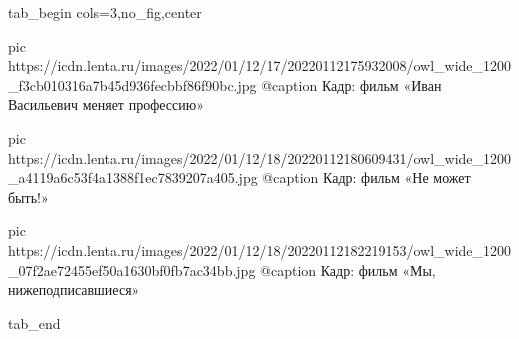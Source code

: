 
 
 
 
 


\ifcmt
  tab_begin cols=3,no_fig,center

     pic https://icdn.lenta.ru/images/2022/01/12/17/20220112175932008/owl_wide_1200_f3cb010316a7b45d936fecbbf86f90bc.jpg
		 @caption Кадр: фильм «Иван Васильевич меняет профессию»

		 pic https://icdn.lenta.ru/images/2022/01/12/18/20220112180609431/owl_wide_1200_a4119a6c53f4a1388f1ec7839207a405.jpg
		 @caption Кадр: фильм «Не может быть!»

		 pic https://icdn.lenta.ru/images/2022/01/12/18/20220112182219153/owl_wide_1200_07f2ae72455ef50a1630bf0fb7ac34bb.jpg
		 @caption Кадр: фильм «Мы, нижеподписавшиеся»

  tab_end
\fi
